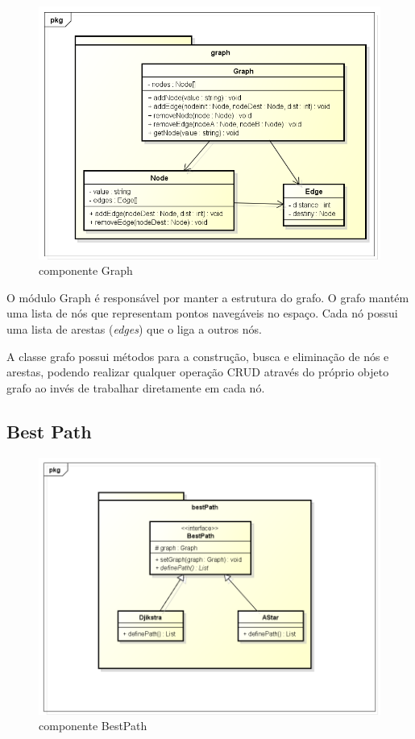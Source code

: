 \begin{figure}[h]
	\centering
	\label{fig26}
		\includegraphics[keepaspectratio=true,scale=0.5]{figuras/pkggraph.png}
	\caption{componente Graph}
\end{figure}

O módulo Graph é responsável por manter a estrutura do grafo. O grafo mantém uma lista de nós que representam pontos navegáveis no espaço. Cada nó possui uma lista de arestas (\textit{edges}) que o liga a outros nós.

A classe grafo possui métodos para a construção, busca e eliminação de nós e arestas, podendo realizar qualquer operação CRUD através do próprio objeto grafo ao invés de trabalhar diretamente em cada nó.

\subsection{Best Path}

\begin{figure}[h]
	\centering
	\label{fig27}
		\includegraphics[keepaspectratio=true,scale=0.5]{figuras/pkgbestPath.png}
	\caption{componente BestPath}
\end{figure}

